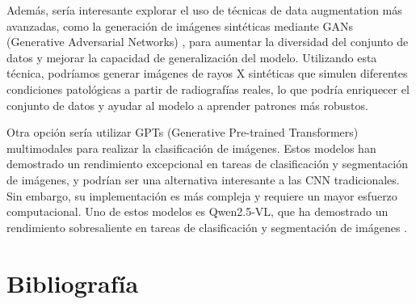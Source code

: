 \documentclass[es]{uc3mreport}
\begin{document}
\begin{report}
    Además, sería interesante explorar el uso de técnicas de data augmentation más avanzadas, como la generación de imágenes sintéticas mediante GANs (Generative Adversarial Networks) \cite{goodfellow2014generativeadversarialnetworks}, para aumentar la diversidad del conjunto de datos y mejorar la capacidad de generalización del modelo. Utilizando esta técnica, podríamos generar imágenes de rayos X sintéticas que simulen diferentes condiciones patológicas a partir de radiografías reales, lo que podría enriquecer el conjunto de datos y ayudar al modelo a aprender patrones más robustos.

    Otra opción sería utilizar GPTs (Generative Pre-trained Transformers) multimodales para realizar la clasificación de imágenes. Estos modelos han demostrado un rendimiento excepcional en tareas de clasificación y segmentación de imágenes, y podrían ser una alternativa interesante a las CNN tradicionales. Sin embargo, su implementación es más compleja y requiere un mayor esfuerzo computacional. Uno de estos modelos es Qwen2.5-VL, que ha demostrado un rendimiento sobresaliente en tareas de clasificación y segmentación de imágenes \cite{bai2025qwen25vltechnicalreport}.

  \end{report}


   \label{bibliography}
   \part{Bibliografía}
   \printbibliography[heading=none]  %


\end{document}
